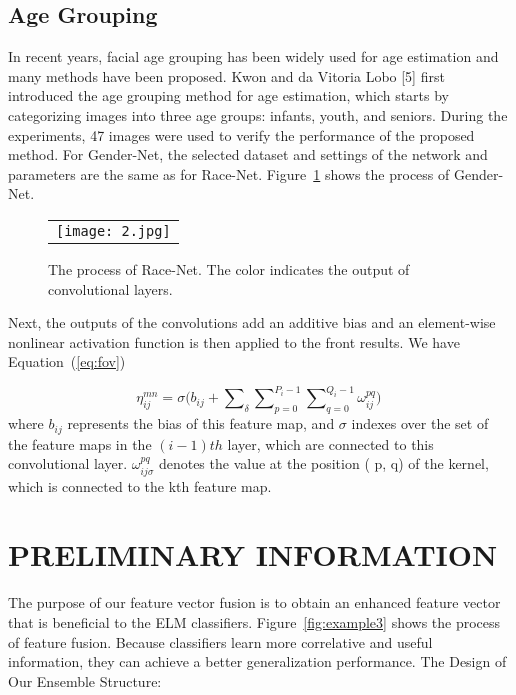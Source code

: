 \documentclass[12pt]{spieman}  %
\begin{document}
\begin{spacing}{2}
\subsection{Age Grouping }
In recent years, facial age grouping has been widely used for age estimation and many methods have been proposed. Kwon and da Vitoria Lobo [5] first introduced the age grouping method for age estimation, which starts by categorizing images into three age groups: infants, youth, and seniors. During the experiments, 47 images were used to verify the performance of the proposed method.
For Gender-Net, the selected dataset and settings of the network and parameters are the same as for Race-Net. Figure~\ref{fig:example2} shows the process of Gender-Net.

\begin{figure}
\begin{center}
\begin{tabular}{c}
\texttt{[image: 2.jpg]}
\end{tabular}
\end{center}
\caption 
{ \label{fig:example2}
The process of Race-Net. The color indicates the output of convolutional layers. } 
\end{figure} 

Next, the outputs of the convolutions add an additive bias and an element-wise nonlinear activation function is then applied to the front results. We have Equation~(\ref{eq:fov})

\begin{equation}
\label{eq:fov}
\eta_{ij}^{mn} = \sigma{(b_{ij}+\sum\nolimits_{\delta}\sum\nolimits_{p=0}^{P_{i}-1}\sum\nolimits_{q=0}^{Q_{i}-1}}\omega_{ij}^{pq})\,
\end{equation}
where $b_{ij}$ represents the bias of this feature map, and $\sigma$ indexes over the set of the feature maps in the $(i - 1)th$ layer, which are connected to this convolutional layer. $\omega_{ij\sigma}^{pq}$ denotes the value at the position ( p, q) of the kernel, which is connected to the kth feature map.

\section{PRELIMINARY INFORMATION}
\label{sect:sections}
The purpose of our feature vector fusion is to obtain an enhanced feature vector that is beneficial to the ELM classifiers. Figure~\ref{fig:example3} shows the process of feature fusion. Because classifiers learn more correlative and useful information, they can achieve a better generalization performance.
The Design of Our Ensemble Structure:


\end{spacing}
\end{document}
